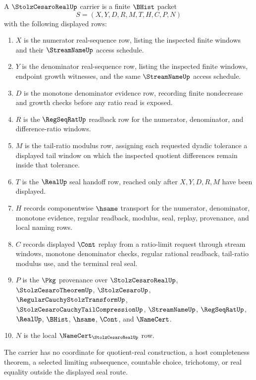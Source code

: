 \begin{definition}
\label{def:stolz-cesaro-real-carrier}
A $\StolzCesaroRealUp$ carrier is a finite $\BHist$ packet
$$
S=(X,Y,D,R,M,T,H,C,P,N)
$$
with the following displayed rows:
\begin{enumerate}
\item $X$ is the numerator real-sequence row, listing the inspected finite windows and their $\StreamNameUp$ access schedule.
\item $Y$ is the denominator real-sequence row, listing the inspected finite windows, endpoint growth witnesses, and the same $\StreamNameUp$ access schedule.
\item $D$ is the monotone denominator evidence row, recording finite nondecrease and growth checks before any ratio read is exposed.
\item $R$ is the $\RegSeqRatUp$ readback row for the numerator, denominator, and difference-ratio windows.
\item $M$ is the tail-ratio modulus row, assigning each requested dyadic tolerance a displayed tail window on which the inspected quotient differences remain inside that tolerance.
\item $T$ is the $\RealUp$ seal handoff row, reached only after $X,Y,D,R,M$ have been displayed.
\item $H$ records componentwise $\hsame$ transport for the numerator, denominator, monotone evidence, regular readback, modulus, seal, replay, provenance, and local naming rows.
\item $C$ records displayed $\Cont$ replay from a ratio-limit request through stream windows, monotone denominator checks, regular rational readback, tail-ratio modulus use, and the terminal real seal.
\item $P$ is the $\Pkg$ provenance over $\StolzCesaroRealUp$, $\StolzCesaroTheoremUp$, $\StolzCesaroUp$, $\RegularCauchyStolzTransformUp$, $\StolzCesaroCauchyTailCompressionUp$, $\StreamNameUp$, $\RegSeqRatUp$, $\RealUp$, $\BHist$, $\hsame$, $\Cont$, and $\NameCert$.
\item $N$ is the local $\NameCert_{\StolzCesaroRealUp}$ row.
\end{enumerate}
The carrier has no coordinate for quotient-real construction, a host completeness theorem, a selected limiting subsequence, countable choice, trichotomy, or real equality outside the displayed seal route.
\end{definition}

